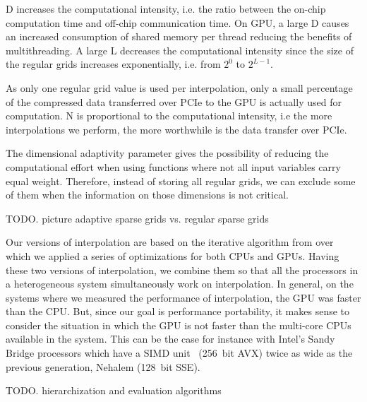 D increases the computational intensity, i.e. the ratio between the on-chip
computation time and off-chip communication time. On GPU, a large D causes an
increased consumption of shared memory per thread reducing the benefits of
multithreading. A large L decreases the computational intensity since the size
of the regular grids increases exponentially, i.e. from $2^0$ to $2^{L-1}$. 

As only one regular grid value is used per interpolation, only a small
percentage of the compressed data transferred over PCIe to the GPU is actually
used for computation. N is proportional to the computational intensity, i.e the
more interpolations we perform, the more worthwhile is the data transfer over
PCIe.

The dimensional adaptivity parameter gives the possibility of reducing the
computational effort when using functions where not all input variables carry
equal weight. Therefore, instead of storing all regular grids, we can exclude
some of them when the information on those dimensions is not critical.

TODO. picture adaptive sparse grids vs. regular sparse grids

Our versions of interpolation are based on the iterative algorithm from
\cite{murarasu2011} over which we applied a series of optimizations for both
CPUs and GPUs. Having these two versions of interpolation, we combine them so
that all the processors in a heterogeneous system simultaneously work on
interpolation. In general, on the systems where we measured the performance of
interpolation, the GPU was faster than the CPU. But, since our goal is
performance portability, it makes sense to consider the situation in which the
GPU is not faster than the multi-core CPUs available in the system. This can be
the case for instance with Intel's Sandy Bridge processors which have a SIMD
unit~\cite{avx} (256~bit AVX) twice as wide as the previous generation, Nehalem
(128~bit SSE).

TODO. hierarchization and evaluation algorithms



